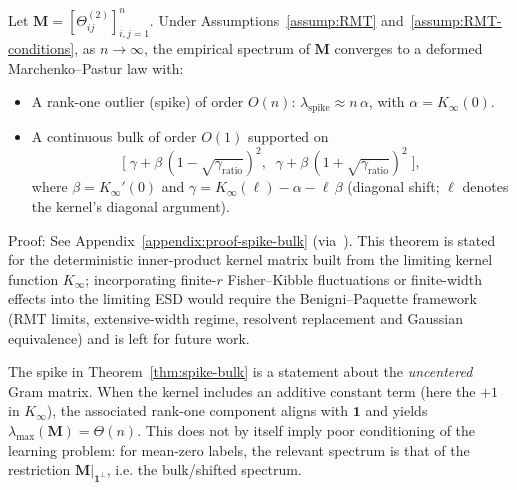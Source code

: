 \begin{theorem}\label{thm:spike-bulk}
Let \( \mathbf{M} = [\Theta^{(2)}_{ij}]_{i,j=1}^n \). Under Assumptions~\ref{assump:RMT} and~\ref{assump:RMT-conditions}, as \( n\to\infty \), the empirical spectrum of \( \mathbf{M} \) converges to a deformed Marchenko–Pastur law with:
\begin{itemize}
    \item A rank-one outlier (spike) of order \(O(n)\): \( \lambda_{\mathrm{spike}} \approx n\,\alpha \), with \( \alpha = K_{\infty}(0) \).
    \item A continuous bulk of order \(O(1)\) supported on
    \[
    \Big[\;\gamma + \beta\,(1-\sqrt{\gamma_{\mathrm{ratio}}})^2,\;\; \gamma + \beta\,(1+\sqrt{\gamma_{\mathrm{ratio}}})^2\;\Big],
    \]
    where \( \beta = K_{\infty}'(0) \) and \( \gamma = K_{\infty}(\ell) - \alpha - \ell\,\beta \) (diagonal shift; \(\ell\) denotes the kernel's diagonal argument).
\end{itemize}
Proof: See Appendix~\ref{appendix:proof-spike-bulk} (via~\cite{El_Karoui_2010}). This theorem is stated for the deterministic inner-product kernel matrix built from the limiting kernel function \(K_\infty\); incorporating finite-\(r\) Fisher--Kibble fluctuations or finite-width effects into the limiting ESD would require the Benigni--Paquette framework~\cite{benigni2025eigenvaluedistributionneuraltangent} (RMT limits, extensive-width regime, resolvent replacement and Gaussian equivalence) and is left for future work.
\end{theorem}

\begin{remark}
The spike in Theorem~\ref{thm:spike-bulk} is a statement about the \emph{uncentered} Gram matrix. When the kernel includes an additive constant term (here the \(+1\) in \(K_\infty\)), the associated rank-one component aligns with \(\mathbf{1}\) and yields \(\lambda_{\max}(\mathbf{M})=\Theta(n)\). This does not by itself imply poor conditioning of the learning problem: for mean-zero labels, the relevant spectrum is that of the restriction \(\mathbf{M}|_{\mathbf{1}^\perp}\), i.e. the bulk/shifted spectrum.
\end{remark}

